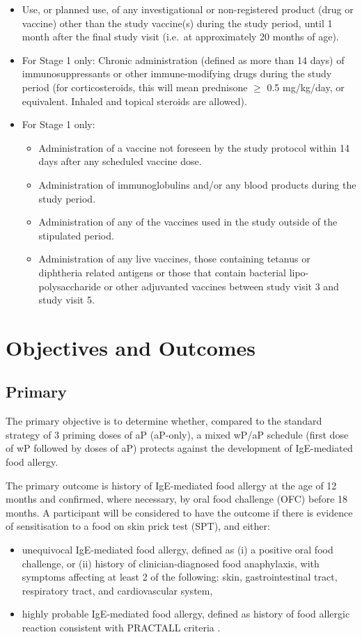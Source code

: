 \documentclass{bmcart}
\begin{document}
\begin{itemize}
	\item Use, or planned use, of any investigational or non-registered product (drug or vaccine) other than the study vaccine(s) during the study period, until 1 month after the final study visit (i.e.~at approximately 20 months of age).
	\item For Stage 1 only: Chronic administration (defined as more than 14 days) of immunosuppressants or other immune-modifying drugs during the study period (for corticosteroids, this will mean prednisone $\geq$ 0.5 mg/kg/day, or equivalent. Inhaled and topical steroids are allowed).
	\item For Stage 1 only:
	
	\begin{itemize}
		\item Administration of a vaccine not foreseen by the study protocol within 14 days after any scheduled vaccine dose.
		\item Administration of immunoglobulins and/or any blood products during the study period.
		\item Administration of any of the vaccines used in the study outside of the stipulated period.
		\item Administration of any live vaccines, those containing tetanus or diphtheria related antigens or those that contain bacterial lipo-polysaccharide or other adjuvanted vaccines between study visit 3 and study visit 5.
	\end{itemize}
\end{itemize}

\section*{Objectives and Outcomes}

\subsection*{Primary}

The primary objective is to determine whether, compared to the standard strategy of 3 priming doses of aP (aP-only), a mixed wP/aP schedule (first dose of wP followed by doses of aP) protects against the development of IgE-mediated food allergy.

The primary outcome is history of IgE-mediated food allergy at the age of 12 months and confirmed, where necessary, by oral food challenge (OFC) before 18 months.
A participant will be considered to have the outcome if there is evidence of sensitisation to a food on skin prick test (SPT), and either:
\begin{itemize}
	\item unequivocal IgE-mediated food allergy, defined as (i) a positive oral food challenge, or (ii) history of clinician-diagnosed food anaphylaxis, with symptoms affecting at least 2 of the following: skin, gastrointestinal tract, respiratory tract, and cardiovascular system,
	\item highly probable IgE-mediated food allergy, defined as history of food allergic reaction consistent with PRACTALL criteria \cite{sampson2012standardizing}.
\end{itemize}
\end{document}
